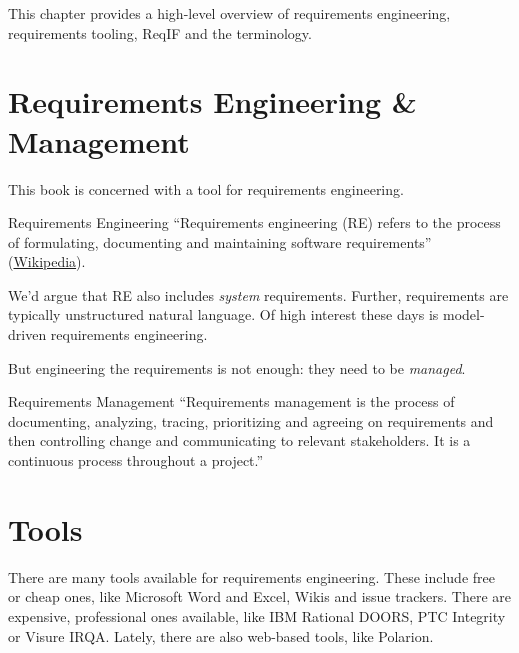 This chapter provides a high-level overview of requirements engineering, requirements tooling, ReqIF and the terminology.

\section{Requirements Engineering \& Management}
\label{sec:requirements_engineering}

This book is concerned with \pror{} a tool for requirements engineering.

\begin{definition}{Requirements Engineering}
``Requirements engineering (RE) refers to the process of formulating, documenting and maintaining software requirements'' (\href{http://en.wikipedia.org/wiki/Requirements_engineering}{Wikipedia}).

We'd argue that RE also includes \textit{system} requirements.  Further, requirements are typically unstructured natural language.  Of high interest these days is model-driven requirements engineering.
\end{definition}

But engineering the requirements is not enough: they need to be \textit{managed}.

\begin{definition}{Requirements Management}
``Requirements management is the process of documenting, analyzing, tracing, prioritizing and agreeing on requirements and then controlling change and communicating to relevant stakeholders. It is a continuous process throughout a project.''
\end{definition}

\section{Tools}
\label{sec:re-tools}

There are many tools available for requirements engineering.  These include free or cheap ones, like Microsoft Word and Excel, Wikis and issue trackers.  There are expensive, professional ones available, like IBM\textregistered{} Rational\textregistered{} DOORS\textregistered{}, PTC Integrity or Visure IRQA.  Lately, there are also web-based tools, like Polarion.

